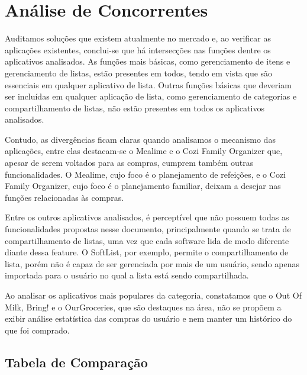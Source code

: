 \chapter{Análise de Concorrentes}

Auditamos soluções que existem atualmente no mercado e, ao verificar
as aplicações existentes, conclui-se que há intersecções nas funções
dentre os aplicativos analisados. As funções mais básicas, como
gerenciamento de itens e gerenciamento de listas, estão presentes em
todos, tendo em vista que são essenciais em qualquer aplicativo de
lista. Outras funções básicas que deveriam ser incluídas em qualquer
aplicação de lista, como gerenciamento de categorias e
compartilhamento de listas, não estão presentes em todos os
aplicativos analisados.

Contudo, as divergências ficam claras quando analisamos o mecanismo
das aplicações, entre elas destacam-se o Mealime e o Cozi Family
Organizer que, apesar de serem voltados para as compras, cumprem
também outras funcionalidades. O Mealime, cujo foco é o planejamento
de refeições, e o Cozi Family Organizer, cujo foco é o planejamento
familiar, deixam a desejar nas funções relacionadas às compras.

Entre os outros aplicativos analisados, é perceptível que não possuem
todas as funcionalidades propostas nesse documento, principalmente
quando se trata de compartilhamento de listas, uma vez que cada
software lida de modo diferente diante dessa feature. O SoftList, por
exemplo, permite o compartilhamento de lista, porém não é capaz de ser
gerenciada por mais de um usuário, sendo apenas importada para o
usuário no qual a lista está sendo compartilhada.

Ao analisar os aplicativos mais populares da categoria, constatamos
que o Out Of Milk, Bring! e o OurGroceries, que são destaques na área,
não se propõem a exibir análise estatística das compras do usuário e
nem manter um histórico do que foi comprado. \DIFaddbegin {}\DIFaddend 

\pagebreak

\section{Tabela de Comparação}

